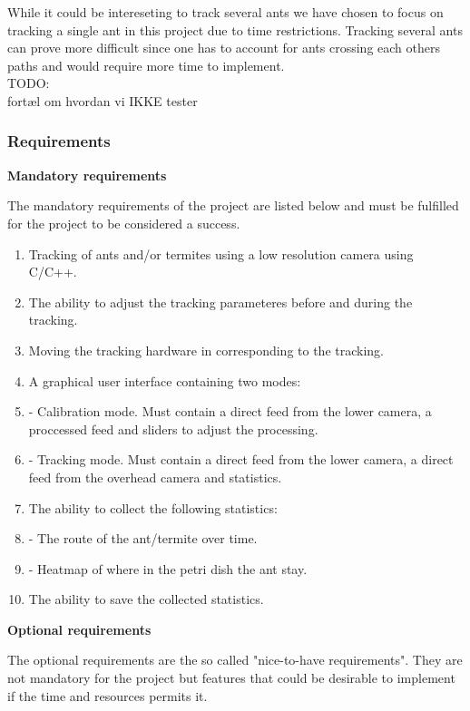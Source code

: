 While it could be intereseting to track several ants we have chosen to focus on tracking a single ant in this project due to time restrictions. Tracking several ants can prove more difficult since one has to account for ants crossing each others paths and would require more time to implement.\\

TODO: \\
fortæl om hvordan vi IKKE tester

\subsubsection{Requirements} \mbox{}\par
\label{requirements}
\noindent \textbf{Mandatory requirements} \par
The mandatory requirements of the project are listed below and must be fulfilled for the project to be considered a success.

\begin{enumerate}
    \item Tracking of ants and/or termites using a low resolution camera using C/C++.
    \item The ability to adjust the tracking parameteres before and during the tracking.
    \item Moving the tracking hardware in corresponding to the tracking.
	\item A graphical user interface containing two modes:
    \item - Calibration mode. Must contain a direct feed from the lower camera, a proccessed feed and sliders to adjust the processing.
    \item - Tracking mode. Must contain a direct feed from the lower camera, a direct feed from the overhead camera and statistics.
    \item The ability to collect the following statistics:
    \item - The route of the ant/termite over time. 
    \item - Heatmap of where in the petri dish the ant stay.
    \item The ability to save the collected statistics.
\end{enumerate}

\noindent \textbf{Optional requirements} \par
The optional requirements are the so called "nice-to-have requirements". They are not mandatory for the project but features that could be desirable to implement if the time and resources permits it.

